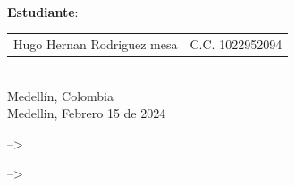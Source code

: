 \documentclass[12pt,a4paper,]{book}
\def\ifdoblecara{} %
\def\ifprincipal{} %
\numberwithin{dummy}{section}
\theoremstyle{ocrenumbox}
\theoremstyle{ocrenumbox}
\theoremstyle{ocrenumbox}
\theoremstyle{ocrenumbox}
\theoremstyle{ocrenum}
\begin{document}
\begin{titlepage}
\begin{minipage}{13.5cm}
\HRule \\[1.5cm]

{\large \textbf{Estudiante}:\\[0.3cm]

\begin{tabular}{cc}
Hugo Hernan Rodriguez mesa & C.C. 1022952094\\
\end{tabular}
}\\[2.5cm]

{\large
Medellín, Colombia
}\\[0.3cm]

{\large
Medellin, Febrero 15 de 2024
}

\end{minipage}

\vfill %

\end{titlepage}






\setlength{\parindent}{1em}

\setlength{\headheight}{15pt}

\pagestyle{fancy}
\ifdefined\ifdoblecara
\fancyhead[LE,RO]{}
\fancyhead[LO,RE]{}
\else
\fancyhead[RO]{}
\fancyhead[LO]{}
\fi
\renewcommand{\headrulewidth}{0pt}
\renewcommand{\footrulewidth}{0pt}

\setcounter{tocdepth}{4}
\tableofcontents

--\textgreater{}

--\textgreater{}

\listoffigures
{}

\listoftables
{}

\cleardoublepage


\ifdefined\ifdoblecara
\fancyhead[LE,RO]{\scriptsize\rightmark}
\fancyfoot[LO,RE]{\scriptsize\slshape \leftmark}
\fancyfoot[C]{}
\fancyfoot[LE,RO]{\footnotesize\thepage}
\else
\fancyhead[RO]{\scriptsize\rightmark}
\fancyfoot[LO]{\scriptsize\slshape \leftmark}
\fancyfoot[C]{}
\fancyfoot[RO]{\footnotesize\thepage}
\fi

\renewcommand{\headrulewidth}{0.4pt}
\renewcommand{\footrulewidth}{0.4pt}

\ifdefined\ifprincipal
\else
\setlength{\parindent}{1em}
\pagestyle{fancy}
\setcounter{tocdepth}{4}
\tableofcontents
\end{document}
